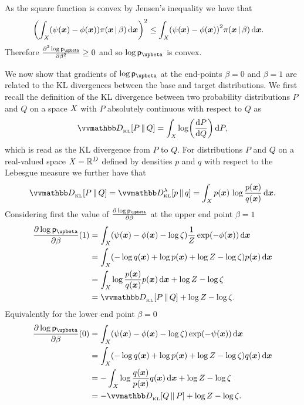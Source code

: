 As the square function is convex by Jensen's inequality we have that
\begin{equation*}
\begin{split}
  &\lpa
    \int_{\set{X}} \lpa \psi(\vct{x}) - \phi(\vct{x})\rpa\pi(\vct{x}\gvn\beta)\,\dr\vct{x}
  \rpa^2 \leq
  \int_{\set{X}} \lpa \psi(\vct{x}) - \phi(\vct{x})\rpa^2 \pi(\vct{x}\gvn\beta)\,\dr\vct{x}.
\end{split}
\end{equation*}
Therefore $\pd{^2\log\pden{\upbeta}}{\beta^2} \geq 0$ and so $\log\pden{\upbeta}$ is convex.

We now show that gradients of $\log\pden{\upbeta}$ at the end-points $\beta=0$ and $\beta=1$ are related to the \ac{KL} divergences between the base and target distributions. We first recall the definition of the \ac{KL} divergence between two probability distributions $P$ and $Q$ on a space $\mathit{X}$ with $P$ absolutely continuous with respect to $Q$ as
\begin{equation}\label{eq:kullback-leibler-probability-measures-ct}
  \kldiv{P}{Q} =
  \int_{\set{X}} \log\lpa\td{P}{Q}\rpa \,\dr P,
\end{equation}
which is read as the \ac{KL} divergence from $P$ to $Q$. For distributions $P$ and $Q$ on a real-valued space $\mathit{X} = \mathbb{R}^D$ defined by densities $p$ and $q$ with respect to the Lebesgue measure we further have that
\begin{equation}\label{eq:kullback-leibler-probability-densities-ct}
  \kldiv{P}{Q} = \kldiv[\lambda]{p}{q} =
  \int_{\set{X}} p(\vct{x}) \, \log\frac{p(\vct{x})}{q(\vct{x})} \, \dr\vct{x}.
\end{equation}
Considering first the value of $\pd{\log\pden{\upbeta}}{\beta}$ at the upper end point $\beta=1$
\begin{align}
  \pd{\log\pden{\upbeta}}{\beta}(1) &= 
  \int_{\set{X}} 
  \lpa \psi(\vct{x}) - \phi(\vct{x}) - \log\zeta \rpa \frac{1}{Z}\exp\lpa-\phi(\vct{x})\rpa
  \,\dr\vct{x}\\
  &=
  \int_{\set{X}}
  \lpa -\log q(\vct{x}) +\log \tgtdens(\vct{x}) +\log Z - \log\zeta \rpa
  \tgtdens(\vct{x})
  \,\dr\vct{x}\\
  &=
  \int_{\set{X}} 
    \log\frac{\tgtdens(\vct{x})}{q(\vct{x})} \tgtdens(\vct{x}) 
  \,\dr\vct{x} + \log Z - \log\zeta \\
  &=
  \kldiv{\tgtprob}{Q} + \log Z - \log\zeta.
\end{align}
Equivalently for the lower end point $\beta=0$
\begin{align}
  \pd{\log\pden{\upbeta}}{\beta}(0) &= 
  \int_{\set{X}} 
  \lpa \psi(\vct{x}) - \phi(\vct{x}) - \log\zeta \rpa \exp\lpa-\psi(\vct{x})\rpa
  \,\dr\vct{x}\\
  &=
  \int_{\set{X}}
  \lpa -\log q(\vct{x}) +\log \tgtdens(\vct{x}) +\log Z - \log\zeta \rpa
  q(\vct{x})
  \,\dr\vct{x}\\
  &=
  -\int_{\set{X}} 
    \log\frac{q(\vct{x})}{\tgtdens(\vct{x})} q(\vct{x}) 
  \,\dr\vct{x} + \log Z - \log\zeta \\
  &=
  -\kldiv{Q}{\tgtprob} + \log Z - \log\zeta.
\end{align}

